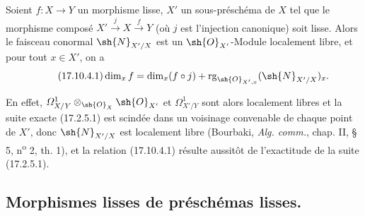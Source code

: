 \begin{corollary}[17.10.4]
\label{IV.17.10.4}
Soient $f:X\to Y$ un morphisme lisse, $X'$ un sous-préschéma de $X$ tel que le morphisme composé $X'\xrightarrow{j}X\xrightarrow{f}Y$ (où $j$ est l'injection canonique) soit lisse. Alors le faisceau conormal $\sh{N}_{X'/X}$ est un $\sh{O}_{X'}$-Module localement libre, et pour tout $x\in X'$, on a
\begin{equation}
\label{IV.17.10.4.1}
\tag{17.10.4.1}
\dim_x f=\dim_x(f\circ j)+\operatorname{rg}_{\sh{O}_{X',x}}(\sh{N}_{X'/X})_x.
\end{equation}
\end{corollary}

En effet, $\varOmega^1_{X/Y}\otimes_{\sh{O}_X}\sh{O}_{X'}$ et $\varOmega^1_{X'/Y}$ sont alors localement libres et la suite exacte (17.2.5.1) est scindée dans un voisinage convenable de chaque point de $X'$, donc $\sh{N}_{X'/X}$ est localement libre (Bourbaki, \emph{Alg. comm.}, chap. II, § 5, n\textsuperscript{o} 2, th. 1), et la relation (17.10.4.1) résulte aussitôt de l'exactitude de la suite (17.2.5.1).

\subsection{Morphismes lisses de préschémas lisses.}


